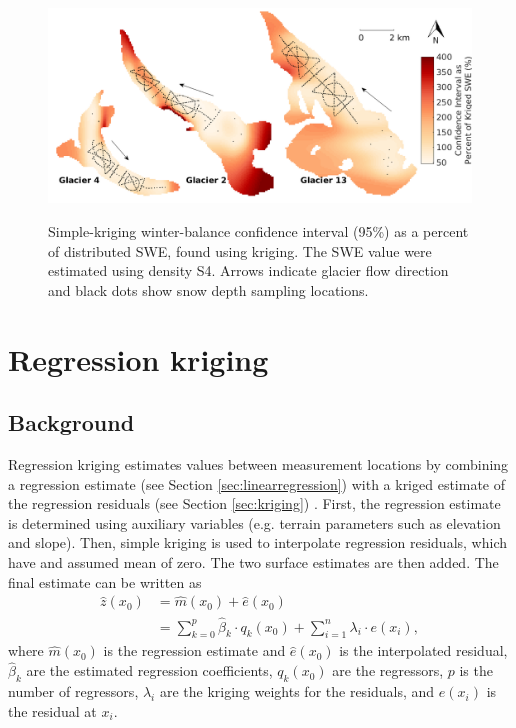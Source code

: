 \documentclass[12pt]{article}
\newcommand{\topomap}{Arrows indicate glacier flow direction and black dots show snow depth sampling locations. }
\begin{document}
\begin{figure}[H]
	\centering
	\includegraphics[width = \textwidth]{KrigingCI_percent.png}\\
	\caption{Simple-kriging winter-balance confidence interval (95\%) as a percent of distributed SWE, found using kriging. The SWE value were estimated using density S4. \topomap}
	\label{fig:Regression-Kriging}
\end{figure}

\section{Regression kriging}

\subsection{Background}

Regression kriging estimates values between measurement locations by combining a regression estimate (see Section \ref{sec:linearregression}) with a kriged estimate of the regression residuals (see Section \ref{sec:kriging}) \citep{Hengl2007}. First, the regression estimate is determined using auxiliary variables (e.g. terrain parameters such as elevation and slope). Then, simple kriging is used to interpolate regression residuals, which have and assumed mean of zero. The two surface estimates are then added. The final estimate can be written as 
\begin{align}
\hat{z}(x_0) &= \hat{m}(x_0) + \hat{e}(x_0)\\
& = \sum^p_{k=0}\hat{\beta}_k \cdot	q_k(x_0)+ \sum_{i=1}^{n} \lambda_i \cdot e(x_i),
\end{align}
where $\hat{m}(x_0)$ is the regression estimate and $\hat{e}(x_0)$ is the interpolated residual, $\hat{\beta}_k$ are the estimated regression coefficients, $q_k(x_0)$ are the regressors, $p$ is the number of regressors, $\lambda_i$ are the kriging weights for the residuals, and $e(x_i)$ is the residual at $x_i$.
\end{document}
